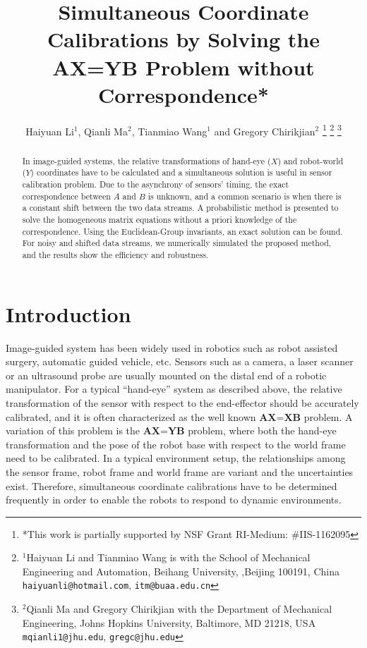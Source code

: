 \documentclass[letterpaper, 10 pt, conference]{ieeeconf}  %
\title{\LARGE \bf
Simultaneous Coordinate Calibrations by Solving the AX=YB Problem without Correspondence*
}
\author{Haiyuan Li$^{1}$, Qianli Ma$^{2}$, Tianmiao Wang$^{1}$ and Gregory Chirikjian$^{2}$%
\thanks{*This work is partially
supported by NSF Grant RI-Medium: \#IIS-1162095}%
\thanks{$^{1}$Haiyuan Li and Tianmiao Wang is with the School of Mechanical Engineering and Automation, Beihang University,
        ,Beijing 100191, China
        {\tt\small haiyuanli@hotmail.com}, {\tt\small itm@buaa.edu.cn}}%
\thanks{$^{2}$Qianli Ma and Gregory Chirikjian with the Department of Mechanical Engineering, Johns Hopkins University,
        Baltimore, MD 21218, USA
        {\tt\small mqianli1@jhu.edu}, {\tt\small gregc@jhu.edu}}%
}
\begin{document}
\maketitle
\thispagestyle{empty}
\pagestyle{empty}


\begin{abstract}

In image-guided systems, the relative transformations of hand-eye ($X$) and robot-world ($Y$) coordinates have to be calculated and a simultaneous solution is useful in sensor calibration problem. Due to the asynchrony of sensors' timing, the exact correspondence between $A$ and $B$ is unknown, and a common scenario is when there is a constant shift between the two data streams. A probabilistic method is presented to solve the
homogeneous matrix equations without a priori knowledge of the correspondence. Using the Euclidean-Group invariants, an exact solution can be found. For noisy and shifted data streams, we numerically simulated the proposed method, and the results show the efficiency and robustness.

\end{abstract}



\section{Introduction}

Image-guided system has been widely used in robotics such as robot assisted surgery, automatic guided vehicle, etc. Sensors such as a camera, a laser scanner or an ultrasound probe are usually mounted on the distal end of a robotic manipulator. For a typical ``hand-eye'' system as described above, the relative transformation of the sensor with respect to the end-effector should be accurately calibrated, and it is often characterized as the well known $\textbf{AX=XB}$ problem. A variation of this problem is the $\textbf{AX=YB}$ problem, where both the hand-eye transformation and the pose of the robot base with respect to the world frame need to be calibrated. In a typical environment setup, the relationships among the sensor frame, robot frame and world frame are variant and the uncertainties exist. Therefore, simultaneous coordinate calibrations have to be determined frequently in order to enable the robots to respond to dynamic environments.
\end{document}
